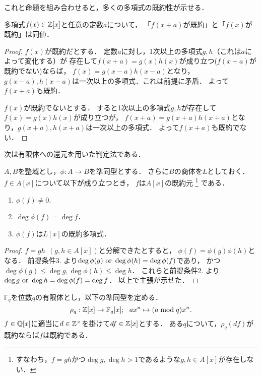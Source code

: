 \documentclass[a4j]{jsarticle}
\begin{document}
これと命題を組み合わせると，多くの多項式の既約性が示せる．
\begin{Prop}
    多項式$f(x) \in \mathbb{Z}[x]$と任意の定数$a$について，
    「$f(x+a)$が既約」と「$f(x)$が既約」は同値．
\end{Prop}
\begin{proof}
    $f(x)$が既約だとする．
    定数$a$に対し，1次以上の多項式$g,h$（これは$a$によって変化する）が
    存在して$f(x+a)=g(x)h(x)$が成り立つ($f(x+a)$が既約でない)ならば，
    $f(x)=g(x-a)h(x-a)$となり，$g(x-a), h(x-a)$は一次以上の多項式．これは前提に矛盾．
    よって$f(x+a)$も既約．

    $f(x)$が既約でないとする．
    すると1次以上の多項式$g,h$が存在して$f(x)=g(x)h(x)$が成り立つが，
    $f(x+a)=g(x+a) h(x+a)$となり，$g(x+a), h(x+a)$は一次以上の多項式．
    よって$f(x+a)$も既約でない．
\end{proof}

次は有限体への還元を用いた判定法である．
\begin{Thm}
    $A,B$を整域とし，$\phi: A \to B$を準同型とする．
    さらに$B$の商体を$L$としておく．
    $f \in A[x]$について以下が成り立つとき，
    $f$は$A[x]$の既約元
    \footnote{すなわち，$f=gh$かつ$\deg g, \deg h >1$であるような$g,h \in A[x]$が存在しない．}
    である．
    \begin{enumerate}
        \item $\phi(f) \neq 0$.
        \item $\deg \phi(f)=\deg f$．
        \item $\phi(f)$は$L[x]$の既約多項式．
    \end{enumerate}
\end{Thm}
\begin{proof}
    $f=gh ~~(g,h \in A[x])$と分解できたとすると，
    $\phi(f)=\phi(g) \phi(h)$となる．
    前提条件3. より$\deg \phi(g) \text{ or } \deg \phi(h)=\deg \phi(f)$であり，
    かつ$\deg \phi(g) \leq \deg g, \deg \phi(h) \leq \deg h$．
    これらと前提条件2. より$\deg g \text{ or } \deg h=\deg \phi(f)=\deg f$．
    以上で主張が示せた．
\end{proof}

\begin{Cor}
    $\mathbb{F}_q$を位数$q$の有限体とし，以下の準同型を定める．
    \[ \rho_q: \mathbb{Z}[x] \to \mathbb{F}_q[x];~~ ax^n \mapsto (a \bmod q)x^n. \]
    $f \in \mathbb{Q}[x]$に適当に$d \in \mathbb{Z}^{\times}$を掛けて$df \in \mathbb{Z}[x]$とする．
    ある$q$について，$\rho_q(df)$が既約ならば$f$は既約である．
\end{Cor}
\end{document}
